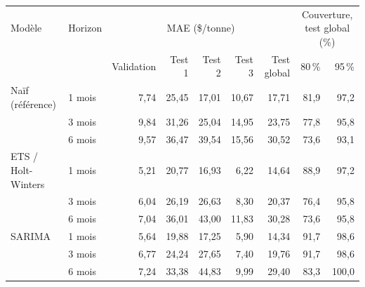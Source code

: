 \begin{tabular}{llrrrrrrr}
\toprule
Modèle & Horizon & \multicolumn{5}{c}{MAE (\$/tonne)} & \multicolumn{2}{c}{Couverture, test global (\%)} \\
\cmidrule(lr){3-7} \cmidrule(lr){8-9}
& & Validation & Test 1 & Test 2 & Test 3 & Test global & 80\,\% & 95\,\% \\
\midrule
Naïf (référence) & 1 mois & 7,74 & 25,45 & 17,01 & 10,67 & 17,71 & 81,9 & 97,2 \\
 & 3 mois & 9,84 & 31,26 & 25,04 & 14,95 & 23,75 & 77,8 & 95,8 \\
 & 6 mois & 9,57 & 36,47 & 39,54 & 15,56 & 30,52 & 73,6 & 93,1 \\
\midrule
ETS / Holt-Winters & 1 mois & 5,21 & 20,77 & 16,93 & 6,22 & 14,64 & 88,9 & 97,2 \\
 & 3 mois & 6,04 & 26,19 & 26,63 & 8,30 & 20,37 & 76,4 & 95,8 \\
 & 6 mois & 7,04 & 36,01 & 43,00 & 11,83 & 30,28 & 73,6 & 95,8 \\
\midrule
SARIMA & 1 mois & 5,64 & 19,88 & 17,25 & 5,90 & 14,34 & 91,7 & 98,6 \\
 & 3 mois & 6,77 & 24,24 & 27,65 & 7,40 & 19,76 & 91,7 & 98,6 \\
 & 6 mois & 7,24 & 33,38 & 44,83 & 9,99 & 29,40 & 83,3 & 100,0 \\
\bottomrule
\end{tabular}
